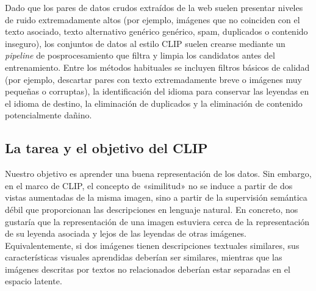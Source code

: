 \documentclass[../../book-main_es.tex]{subfiles}
\begin{document}
Dado que los pares de datos crudos extraídos de la web suelen presentar niveles de ruido extremadamente altos
(por ejemplo, imágenes que no coinciden con el texto asociado, texto alternativo genérico genérico, 
spam, duplicados o contenido inseguro), los conjuntos de datos al estilo CLIP suelen crearse 
mediante un \textit{pipeline} de posprocesamiento que filtra y limpia los candidatos antes del 
entrenamiento. Entre los métodos habituales se incluyen filtros básicos de calidad (por ejemplo, 
descartar pares con texto extremadamente breve o imágenes muy pequeñas o corruptas), la 
identificación del idioma para conservar las leyendas en el idioma de destino, la 
eliminación de duplicados y la eliminación de contenido potencialmente dañino.

\subsection{La tarea y el objetivo del CLIP}
Nuestro objetivo es aprender una buena representación de los datos. Sin embargo, en el marco 
de CLIP, el concepto de «similitud» no se induce a partir de dos vistas aumentadas de la misma 
imagen, sino a partir de la supervisión semántica débil que proporcionan las descripciones en 
lenguaje natural. En concreto, nos gustaría que la representación de una imagen estuviera cerca
de la representación de su leyenda asociada y lejos de las leyendas de otras imágenes. 
Equivalentemente, si dos imágenes tienen descripciones textuales similares, sus características 
visuales aprendidas deberían ser similares, mientras que las imágenes descritas por textos no 
relacionados deberían estar separadas en el espacio latente.
\end{document}
